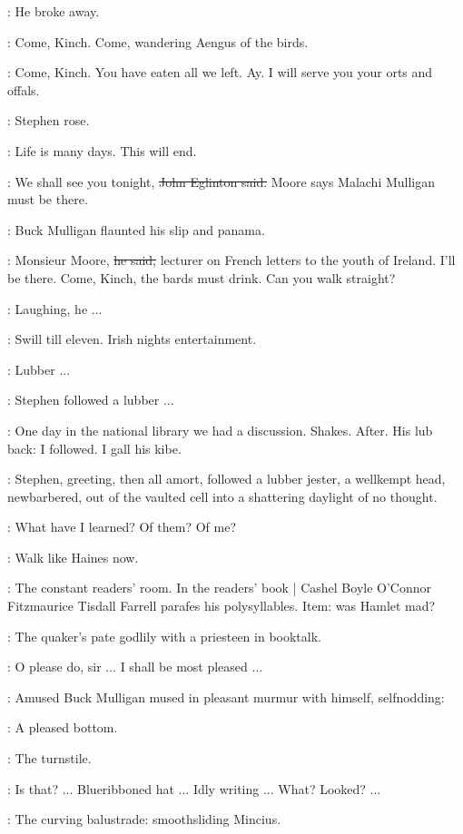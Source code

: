 :
He broke away.

\mulligan:
Come, Kinch.
Come, wandering Aengus of the birds.

\StephenInt:
Come, Kinch.
You have eaten all we left.
Ay.
I will serve you your orts and offals.

:
Stephen rose.

\StephenInt:
Life is many days.
This will end.

\eglinton:
We shall see you tonight,
\sout{John Eglinton said.}
 Moore says Malachi Mulligan must be there.

:
Buck Mulligan flaunted his slip and panama.

\mulligan:
Monsieur Moore,
\sout{he said,}
lecturer on French letters to the youth of Ireland.
I'll be there.
Come, Kinch,
the bards must drink.
Can you walk straight?

:
Laughing, he ...

\StephenInt:
Swill till eleven.
Irish nights entertainment.

\StephenInt:
Lubber ...

\StephenInt:
Stephen followed a lubber ...

\StephenInt:
One day in the national library we had a discussion.
Shakes.
After.
His lub back:
I followed.
I gall his kibe.

:
Stephen,
greeting,
then all amort,
followed
a lubber jester,
a wellkempt head,
newbarbered,
out of the vaulted cell
into a shattering daylight of no thought.

\StephenInt:
What have I learned?
Of them?
Of me?

\StephenInt:
Walk like Haines now.

\StephenInt:
The constant readers' room.
In the readers' book |
Cashel Boyle O'Connor Fitzmaurice Tisdall Farrell parafes his polysyllables.
Item: was Hamlet mad?

:
The quaker's pate godlily with a priesteen in booktalk.

\librarian:
O please do, sir ...
I shall be most pleased ...

:
Amused Buck Mulligan mused in pleasant murmur with himself,
self\-nodding:

\mulligan:
A pleased bottom.

\StephenInt:
The turnstile.

\StephenInt:
Is that? ...
Blueribboned hat ...
Idly writing ...
What?
Looked? ...

\StephenInt:
The curving balustrade:
smoothsliding Mincius.

